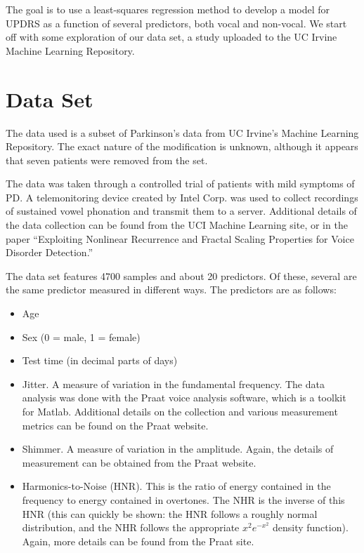 \documentclass{report}
\begin{document}
The goal is to use a least-squares regression method to develop a model for UPDRS as a function of several predictors, both vocal and non-vocal. We start off with some
exploration of our data set, a study uploaded to the UC Irvine Machine Learning Repository.


\section*{Data Set}

The data used is a subset of Parkinson's data from UC Irvine's Machine Learning Repository. The exact nature of the modification is unknown, %
although it appears that seven patients were removed from the set.

The data was taken through a controlled trial of patients with mild symptoms of PD. A telemonitoring device created by Intel Corp. was used to collect recordings of sustained vowel phonation
and transmit them to a server. Additional details of the data collection can be found from the UCI Machine Learning site, or in the paper ``Exploiting Nonlinear Recurrence and Fractal Scaling Properties for Voice Disorder Detection.''\cite{data}

The data set features 4700 samples and about 20 predictors. Of these, several are the same predictor measured in different ways. The predictors are as follows:

\begin{itemize}

\item Age
\item Sex (0 = male, 1 = female)
\item Test time (in decimal parts of days)
\item Jitter. A measure of variation in the fundamental frequency. The data analysis was done with the Praat voice analysis software, which is a toolkit for Matlab. Additional
        details on the collection and various measurement metrics can be found on the Praat website. 
\item Shimmer. A measure of variation in the amplitude. Again, the details of measurement can be obtained from the Praat website.
\item Harmonics-to-Noise (HNR). This is the ratio of energy contained in the frequency to energy contained in overtones. The NHR is the inverse of this HNR (this can quickly be shown: the HNR follows a roughly normal distribution, and the NHR follows the appropriate $x^2e^{-x^2}$ density function). Again, more details can be found from the Praat site.
\end{itemize}
\end{document}
